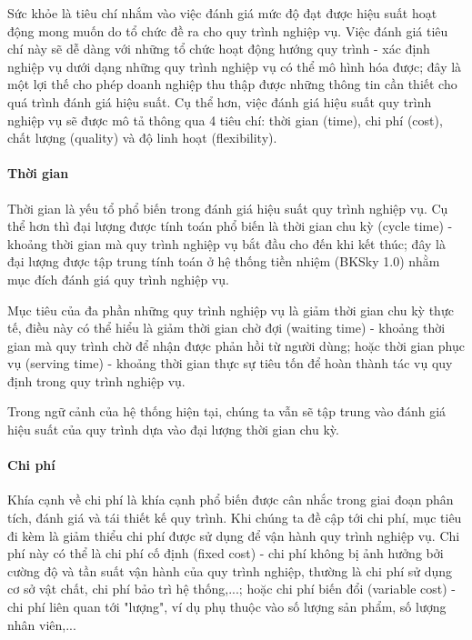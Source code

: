 Sức khỏe là tiêu chí nhắm vào việc đánh giá mức độ đạt được hiệu suất hoạt động mong muốn do tổ chức đề ra cho quy trình nghiệp vụ. Việc đánh giá tiêu chí này sẽ dễ dàng với những tổ chức hoạt động hướng quy trình - xác định nghiệp vụ dưới dạng những quy trình nghiệp vụ có thể mô hình hóa được; đây là một lợi thế cho phép doanh nghiệp thu thập được những thông tin cần thiết cho quá trình đánh giá hiệu suất. Cụ thể hơn, việc đánh giá hiệu suất quy trình nghiệp vụ sẽ được mô tả thông qua 4 tiêu chí: thời gian (time), chi phí (cost), chất lượng (quality) và độ linh hoạt (flexibility).
    \paragraph{Thời gian}\mbox{}
    
    Thời gian là yếu tổ phổ biến trong đánh giá hiệu suất quy trình nghiệp vụ. Cụ thể hơn thì đại lượng được tính toán phổ biến là thời gian chu kỳ (cycle time) - khoảng thời gian mà quy trình nghiệp vụ bắt đầu cho đến khi kết thúc; đây là đại lượng được tập trung tính toán ở hệ thống tiền nhiệm (BKSky 1.0) nhằm mục đích đánh giá quy trình nghiệp vụ. 
    
    Mục tiêu của đa phần những quy trình nghiệp vụ là giảm thời gian chu kỳ thực tế, điều này có thể hiểu là giảm thời gian chờ đợi (waiting time) - khoảng thời gian mà quy trình chờ để nhận được phản hồi từ người dùng; hoặc thời gian phục vụ (serving time) - khoảng thời gian thực sự tiêu tốn để hoàn thành tác vụ quy định trong quy trình nghiệp vụ.

    Trong ngữ cảnh của hệ thống hiện tại, chúng ta vẫn sẽ tập trung vào đánh giá hiệu suất của quy trình dựa vào đại lượng thời gian chu kỳ.
    
    \paragraph{Chi phí}\mbox{}

    Khía cạnh về chi phí là khía cạnh phổ biến được cân nhắc trong giai đoạn phân tích, đánh giá và tái thiết kế quy trình. Khi chúng ta đề cập tới chi phí, mục tiêu đi kèm là giảm thiểu chi phí được sử dụng để vận hành quy trình nghiệp vụ. Chi phí này có thể là chi phí cố định (fixed cost) - chi phí không bị ảnh hưởng bởi cường độ và tần suất vận hành của quy trình nghiệp, thường là chi phí sử dụng cơ sở vật chất, chi phí bảo trì hệ thống,...; hoặc chi phí biến đổi (variable cost) - chi phí liên quan tới "lượng", ví dụ phụ thuộc vào số lượng sản phẩm, số lượng nhân viên,...
    
